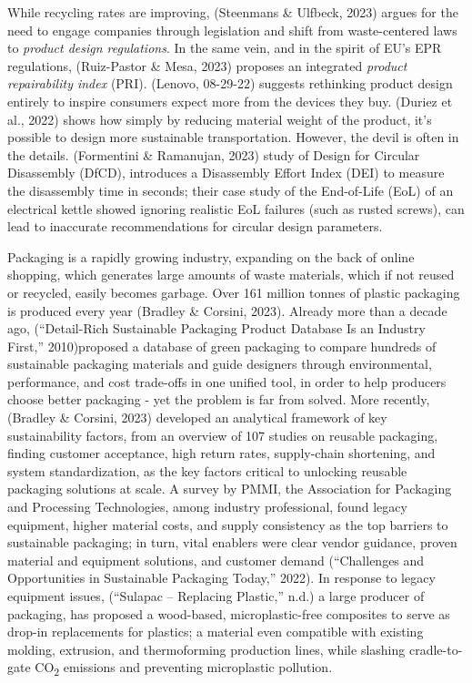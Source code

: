 \documentclass[
  12pt,
  letterpaper,
  DIV=11,
  numbers=noendperiod]{scrartcl}
\begin{document}
While recycling rates are improving, (Steenmans \& Ulfbeck, 2023) argues
for the need to engage companies through legislation and shift from
waste-centered laws to \emph{product design regulations}. In the same
vein, and in the spirit of EU's EPR regulations, (Ruiz-Pastor \& Mesa,
2023) proposes an integrated \emph{product repairability index} (PRI).
(Lenovo, 08-29-22) suggests rethinking product design entirely to
inspire consumers expect more from the devices they buy. (Duriez et al.,
2022) shows how simply by reducing material weight of the product, it's
possible to design more sustainable transportation. However, the devil
is often in the details. (Formentini \& Ramanujan, 2023) study of Design
for Circular Disassembly (DfCD), introduces a Disassembly Effort Index
(DEI) to measure the disassembly time in seconds; their case study of
the End-of-Life (EoL) of an electrical kettle showed ignoring realistic
EoL failures (such as rusted screws), can lead to inaccurate
recommendations for circular design parameters.

Packaging is a rapidly growing industry, expanding on the back of online
shopping, which generates large amounts of waste materials, which if not
reused or recycled, easily becomes garbage. Over 161 million tonnes of
plastic packaging is produced every year (Bradley \& Corsini, 2023).
Already more than a decade ago, ({``Detail-Rich Sustainable Packaging
{Product Database} Is an Industry First,''} 2010)proposed a database of
green packaging to compare hundreds of sustainable packaging materials
and guide designers through environmental, performance, and cost
trade-offs in one unified tool, in order to help producers choose better
packaging - yet the problem is far from solved. More recently, (Bradley
\& Corsini, 2023) developed an analytical framework of key
sustainability factors, from an overview of 107 studies on reusable
packaging, finding customer acceptance, high return rates, supply-chain
shortening, and system standardization, as the key factors critical to
unlocking reusable packaging solutions at scale. A survey by PMMI, the
Association for Packaging and Processing Technologies, among industry
professional, found legacy equipment, higher material costs, and supply
consistency as the top barriers to sustainable packaging; in turn, vital
enablers were clear vendor guidance, proven material and equipment
solutions, and customer demand ({``Challenges and {Opportunities} in
{Sustainable Packaging Today},''} 2022). In response to legacy equipment
issues, ({``Sulapac -- {Replacing} Plastic,''} n.d.) a large producer of
packaging, has proposed a wood-based, microplastic-free composites to
serve as drop-in replacements for plastics; a material even compatible
with existing molding, extrusion, and thermoforming production lines,
while slashing cradle-to-gate CO\textsubscript{2} emissions and
preventing microplastic pollution.
\end{document}
